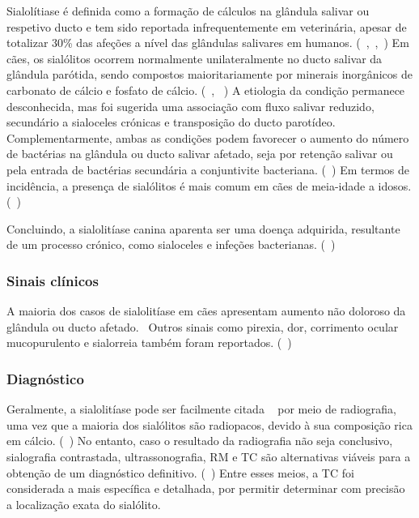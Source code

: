 Sialolítiase é definida como a formação de cálculos na glândula salivar ou respetivo ducto e tem sido reportada infrequentemente em veterinária, apesar de totalizar 30\% das afeções a nível das glândulas salivares em humanos. (~\cite{perez-ecija_granulomatous_2012},~\cite{Han2016},~\cite{Ryan2008}) Em cães, os sialólitos ocorrem normalmente unilateralmente no ducto salivar da glândula parótida, sendo compostos maioritariamente por minerais inorgânicos de carbonato de cálcio e fosfato de cálcio. (~\cite{perez-ecija_granulomatous_2012}, ~\cite{Han2016}) A etiologia da condição permanece desconhecida, mas foi sugerida uma associação com fluxo salivar reduzido, secundário a sialoceles crónicas e transposição do ducto parotídeo. ~\cite{perez-ecija_granulomatous_2012,Han2016,Ryan2008} Complementarmente, ambas as condições podem favorecer o aumento do número de bactérias na glândula ou ducto salivar afetado, seja por retenção salivar ou pela entrada de bactérias secundária a conjuntivite bacteriana. (~\cite{Han2016}) 
Em termos de incidência, a presença de sialólitos é mais comum em cães de meia-idade a idosos. (~\cite{Han2016}) 


Concluindo, a sialolitíase canina aparenta ser uma doença adquirida, resultante de um processo crónico, como sialoceles e infeções bacterianas. (~\cite{Han2016})


\subsubsection{Sinais clínicos}


A maioria dos casos de sialolitíase em cães apresentam aumento não doloroso da glândula ou ducto afetado. ~\cite{Han2016,perez-ecija_granulomatous_2012}Outros sinais como pirexia, dor, corrimento ocular mucopurulento e sialorreia também foram reportados. (~\cite{Han2016})


\subsubsection{Diagnóstico}



Geralmente, a sialolitíase pode ser facilmente citada ~\cite{Kumar2017} por meio de radiografia, uma vez que a maioria dos sialólitos são radiopacos, devido à sua composição rica em cálcio. (~\cite{Han2016}) No entanto, caso o resultado da radiografia não seja conclusivo, sialografia contrastada, ultrassonografia, RM e TC são alternativas viáveis para a obtenção de um diagnóstico definitivo. (~\cite{Han2016}) Entre esses meios, a TC foi considerada a mais específica e detalhada, por permitir determinar com precisão a localização exata do sialólito. ~\cite{Han2016,perez-ecija_granulomatous_2012}

